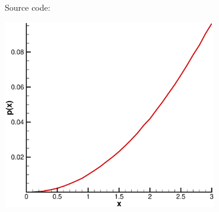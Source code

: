 \documentclass[12pt]{article}
\begin{document}
Source code:


\begin{center}
\includegraphics[width=0.7\textwidth]{pdf_x2.eps}
\end{center}


% 
% 
\end{document}
